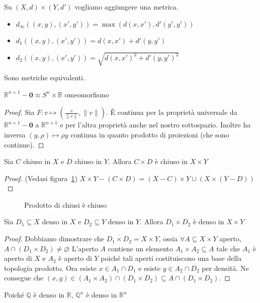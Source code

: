 \begin{definition}
    Su \((X, d) \times (Y, d')\) vogliamo aggiungere una metrica.
\begin{itemize}[label = --]
    \item \(d_\infty((x,y), (x', y')) = \max(d(x,x'), d'(y', y'))\) 
    \item \(d_{1}((x,y), (x', y')) = d(x, x') + d'(y, y')\) 
    \item \(d_{2}((x,y),(x', y')) = \sqrt{d{(x,x')}^2+d'{(y,y')}^2}\) 
\end{itemize}
Sono metriche equivalenti.
\end{definition}
\begin{proposition}
    \(\mathbb{R}^{n+1} - \mathbf{0} \approx S^{n}\times \mathbb{R}\)
    omeomorfismo
\end{proposition}
\begin{proof}
    Sia \(F: v \mapsto (\frac{v}{\|v\|}, \|v\|)\). È continua per la proprietà
    universale da \(\mathbb{R}^{n+1} - \mathbf{0}\) a \(\mathbb{R}^{n+1}\) e per l'altra
    proprietà anche nel nostro sottospazio. Inoltre ha inversa \((y, \rho)
    \mapsto \rho y\) continua in quanto prodotto di proiezioni (che sono
    continue).
\end{proof}

\begin{proposition}
    Sia \(C\) chiuso in \(X\) e \(D\) chiuso in \(Y\). Allora \(C \times D\) è
    chiuso in \(X\times Y\) 
\end{proposition}
\begin{proof}
    (Vedasi figura~\ref{fig:chiuso-prodotto}) \(X \times Y - (C \times D) = (X
    - C) \times Y \cup (X\times (Y - D))\) 
\end{proof}
\begin{figure}[ht]
    \centering
    \tiny{}
    \caption{Prodotto di chiusi è chiuso}
    \label{fig:chiuso-prodotto}
\end{figure}
\begin{proposition}
    Sia \(D_{1} \subseteq X \) denso in \(X\)  e \(D_{2} \subseteq Y \) denso in
    \(Y\). Allora \(D_{1} \times D_{2}\) è denso in \(X \times Y\) 
\end{proposition}
\begin{proof}
    Dobbiamo dimostrare che \(\overline{D_{1} \times D_{2}} = X \times Y\),
    ossia \(\forall A \subseteq X \times Y \) aperto, \(A \cap (D_{1} \times
    D_{2}) \neq \varnothing\) 
    L'aperto \(A\) contiene un elemento \(A_{1} \times A_{2} \subseteq A \) tale
    che \(A_{1}\) è aperto di \(X\) e \(A_{2}\) è aperto di \(Y\) poiché tali
    aperti costituiscono una base della topologia prodotto.
    Ora esiste \(x \in A_{1} \cap D_{1} \) e esiste \(y \in A_{2} \cap D_{2}\)
    per densità. Ne consegue che \((x, y) \in {(A_{1} \times A_{2})} \cap (D_{1}
    \times D_{2}) \subseteq A \cap {(D_{1} \times D_{2})} \).
\end{proof}
\begin{example}
    Poiché \(\mathbb{Q}\) è denso in \(\mathbb{R}\), \(\mathbb{Q}^{n}\) è denso
    in \(\mathbb{R}^{n}\) 
\end{example}

